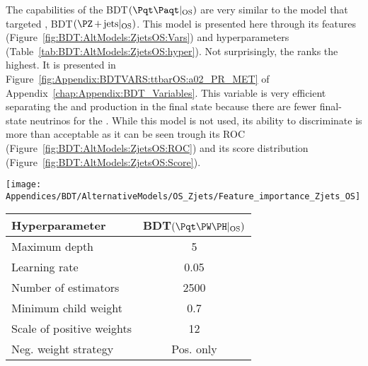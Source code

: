 The capabilities of the BDT$(\ttbar|_{\text{OS}})$ are very similar to the model that targeted \Zjets, BDT$(\Zjets|_{\text{OS}})$.
This model is presented here through its features (Figure~\ref{fig:BDT:AltModels:ZjetsOS:Vars}) and hyperparameters 
(Table~\ref{tab:BDT:AltModels:ZjetsOS:hyper}). 
Not surprisingly, the \MET ranks the highest. It is presented in Figure~\ref{fig:Appendix:BDTVARS:ttbarOS:a02_PR_MET} of
 Appendix~\ref{chap:Appendix:BDT_Variables}. This variable is very efficient separating the \Zjets and \ttbar production in
the \dilepOStau final state because there are fewer final-state neutrinos for the \Zjets.
While this model is not used, its ability to discriminate is more than acceptable
as it can be seen trough its ROC (Figure~\ref{fig:BDT:AltModels:ZjetsOS:ROC}) and its score distribution 
(Figure~\ref{fig:BDT:AltModels:ZjetsOS:Score}). 

    \begin{minipage}[c]{0.55\textwidth}
        \texttt{[image: Appendices/BDT/AlternativeModels/OS\_Zjets/Feature\_importance\_Zjets\_OS]} 
        \label{fig:BDT:AltModels:ZjetsOS:Vars}
    \end{minipage}
    \hfill
    \begin{minipage}{0.4\textwidth}
	\centering
	\begin{adjustbox}{max width=0.99\textwidth}
		\begin{tabular}{l|c}
		\toprule
		Hyperparameter            	& BDT$(\tWH|_{\text{OS}})$ \\ \midrule
		Maximum depth             	& 5                        \\
		Learning rate             	& 0.05                   \\
		Number of estimators      	& 2500                     \\
		Minimum child weight       	& 0.7                     \\
		Scale of positive weights 	& 12                  \\
		Neg. weight strategy      	& Pos. only           \\ \bottomrule
		\end{tabular}
	\end{adjustbox}
	\label{tab:BDT:AltModels:ZjetsOS:hyper}
    \end{minipage}

